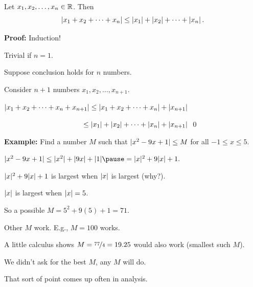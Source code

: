 \documentclass[10pt,aspectratio=149]{beamer}
\begin{document}
\begin{frame}

\begin{corollary}
Let $x_1, x_2, \ldots, x_n \in {\mathbb{R}}$.  Then
\begin{equation*}
\left\lvert {x_1 + x_2 + \cdots + x_n} \right\rvert \leq 
\left\lvert {x_1} \right\rvert + \left\lvert {x_2} \right\rvert + \cdots + \left\lvert {x_n} \right\rvert .
\end{equation*}
\end{corollary}
\pause

\textbf{Proof:}
Induction!

\medskip
\pause

Trivial if $n=1$.

\medskip
\pause

Suppose conclusion holds for $n$ numbers.

\pause
Consider $n+1$ numbers $x_1,x_2,\ldots,x_{n+1}$.

\pause
\medskip

$\displaystyle
\lvert {x_1 + x_2 + \cdots + x_n + x_{n+1}} \rvert \leq 
\lvert {x_1 + x_2 + \cdots + x_n} \rvert + \lvert {x_{n+1}} \rvert$

\medskip
\pause
$\displaystyle
\hspace{1.53in}\leq 
\lvert {x_1} \rvert + \lvert {x_2} \rvert + \cdots + \lvert {x_n} \rvert + \lvert {x_{n+1}} \rvert
$
\qed
\end{frame}

\begin{frame}

\textbf{Example:}
Find a number $M$ such that $\lvert {x^2-9x+1} \rvert \leq M$ for all $-1 \leq x \leq
5$.

\pause
\medskip


$
\sabs{x^2-9x+1} \leq \sabs{x^2}+\sabs{9x}+\sabs{1}
\pause
=
\sabs{x}^2+9\sabs{x}+1 .
$

\medskip
\pause

$\lvert {x} \rvert^2+9\lvert {x} \rvert+1$ is largest when $\left\lvert {x} \right\rvert$ is largest (why?).

\medskip
\pause

$\left\lvert {x} \right\rvert$ is largest when $\left\lvert {x} \right\rvert=5$.

\medskip
\pause

So a possible $M = 5^2+9(5)+1 = 71$.

\medskip
\pause

Other $M$ work.  E.g., $M=100$ works.

\pause
A little calculus shows $M=\nicefrac{77}{4}=19.25$ would also work (smallest
such $M$).

\medskip
\pause

We didn't ask for the best $M$, any $M$ will do.

\medskip
\pause

That sort of point comes up often in analysis.

\end{frame}
\end{document}
